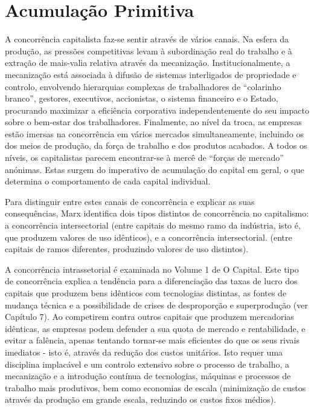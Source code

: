 \section{Acumulação Primitiva}
 \par 
A concorrência capitalista faz-se sentir através de vários canais. Na esfera da produção, as pressões competitivas levam à subordinação real do trabalho e à extração de mais-valia relativa através da mecanização. Institucionalmente, a mecanização está associada à difusão de sistemas interligados de propriedade e controlo, envolvendo hierarquias complexas de trabalhadores de “colarinho branco”, gestores, executivos, accionistas, o sistema financeiro e o Estado, procurando maximizar a eficiência corporativa independentemente do seu impacto sobre o bem-estar dos trabalhadores. Finalmente, ao nível da troca, as empresas estão imersas na concorrência em vários mercados simultaneamente, incluindo os dos meios de produção, da força de trabalho e dos produtos acabados. A todos os níveis, os capitalistas parecem encontrar-se à mercê de “forças de mercado” anónimas. Estas surgem do imperativo de acumulação do capital em geral, o que determina o comportamento de cada capital individual.
 \par 
Para distinguir entre estes canais de concorrência e explicar as suas consequências, Marx identifica dois tipos distintos de concorrência no capitalismo: a concorrência intersectorial (entre capitais do mesmo ramo da indústria, isto é, que produzem valores de uso idênticos), e a concorrência intersectorial. (entre capitais de ramos diferentes, produzindo valores de uso distintos).
 \par 
A concorrência intrassetorial é examinada no Volume {\color{blue}1} de O Capital. Este tipo de concorrência explica a tendência para a diferenciação das taxas de lucro dos capitais que produzem bens idênticos com tecnologias distintas, as fontes de mudança técnica e a possibilidade de crises de desproporção e superprodução (ver Capítulo {\color{blue}7}). Ao competirem contra outros capitais que produzem mercadorias idênticas, as empresas podem defender a sua quota de mercado e rentabilidade, e evitar a falência, apenas tentando tornar-se mais eficientes do que os seus rivais imediatos - isto é, através da redução dos custos unitários. Isto requer uma disciplina implacável e um controlo extensivo sobre o processo de trabalho, a mecanização e a introdução contínua de tecnologias, máquinas e processos de trabalho mais produtivos, bem como economias de escala (minimização de custos através da produção em grande escala, reduzindo os custos fixos médios).
